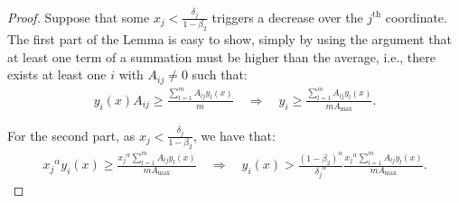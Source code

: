 \documentclass[11pt]{article}
\begin{document}
\begin{proof}
Suppose that some $x_j<\frac{\delta_j}{1-\beta_2}$ triggers a decrease over the $j^\text{th}$ coordinate.
The first part of the Lemma is easy to show, simply by using the argument that at least one term of a summation must be higher than the average, i.e., there exists at least one $i$ with $A_{ij}\neq 0$ such that:
\begin{align*}
y_i(x) A_{ij} \geq \frac{\sum_{l=1}^m A_{lj}y_l(x)}{m}
\quad\Rightarrow\quad y_i \geq \frac{\sum_{l=1}^m A_{lj}y_l(x)}{mA_{\max}}.
\end{align*}

For the second part, as $x_j < \frac{\delta_j}{1-\beta_2}$, we have that:
\begin{align*}
{x_j}^\alpha y_i(x) \geq \frac{{x_j}^\alpha\sum_{l=1}^m A_{lj}y_l(x)}{mA_{\max}} 
\quad\Rightarrow\quad y_i(x) > \frac{(1-\beta_2)^\alpha}{{\delta_j}^\alpha}\frac{{x_j}^\alpha\sum_{l=1}^m A_{lj}y_l(x)}{mA_{\max}}.
\end{align*}


\end{proof}
\end{document}
